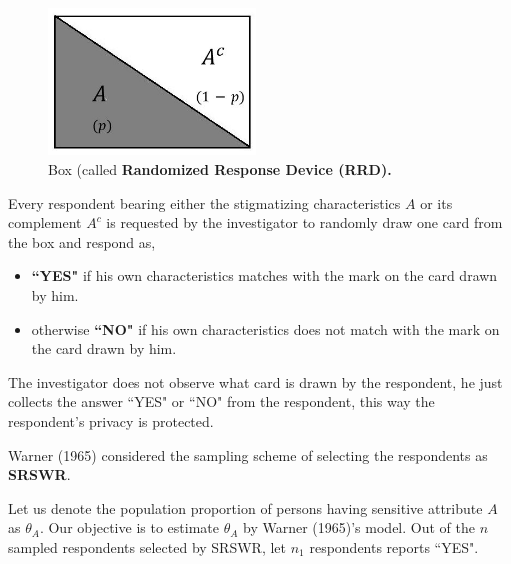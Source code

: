 \documentclass[12pt]{article}
\theoremstyle{definition}
\begin{document}
\begin{figure}\label{SS1}
\centering
\includegraphics[width=5.5cm]{SS figures/SS1.JPG}
\caption{Box (called \textbf{Randomized Response Device (RRD).}}\label{SS1}
\end{figure}
Every respondent bearing either the stigmatizing characteristics $A$ or its complement $A^c$ is requested by the investigator to randomly draw one card from the box and respond as,
\begin{itemize}
    \item \textbf{``YES"} if his own characteristics matches with the mark on the card drawn by him.
    \item otherwise \textbf{``NO"} if his own characteristics does not match with the mark on the card drawn by him.
\end{itemize}
 
The investigator does not observe what card is drawn by the respondent, he just collects the answer ``YES" or ``NO" from the respondent, this way the respondent's privacy is protected.

Warner (1965) considered the sampling scheme of selecting the respondents as \textbf{SRSWR}.

Let us denote the population proportion of persons having sensitive attribute $A$ as $\theta_A$. Our objective is to estimate $\theta_A$ by Warner (1965)'s model. Out of the $n$ sampled respondents selected by SRSWR, let $n_1$ respondents reports ``YES".
\end{document}
